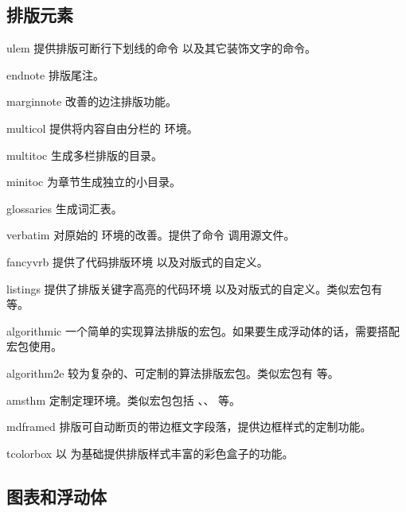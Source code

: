 \subsection{排版元素}\label{subsec:pkg-elements}

\begin{pkglist}
  \item[ulem]        提供排版可断行下划线的命令  以及其它装饰文字的命令。
  \item[endnote]     排版尾注。
  \item[marginnote]  改善的边注排版功能。
  \item[multicol]    提供将内容自由分栏的  环境。
  \item[multitoc]    生成多栏排版的目录。
  \item[minitoc]     为章节生成独立的小目录。
  \item[glossaries]  生成词汇表。
  \item[verbatim]    对原始的  环境的改善。提供了命令  调用源文件。
  \item[fancyvrb]    提供了代码排版环境  以及对版式的自定义。
  \item[listings]    提供了排版关键字高亮的代码环境  以及对版式的自定义。类似宏包有  等。
  \item[algorithmic] 一个简单的实现算法排版的宏包。如果要生成浮动体的话，需要搭配  宏包使用。
  \item[algorithm2e] 较为复杂的、可定制的算法排版宏包。类似宏包有  等。
  \item[amsthm]      定制定理环境。类似宏包包括 、、 等。
  \item[mdframed]    排版可自动断页的带边框文字段落，提供边框样式的定制功能。
  \item[tcolorbox]   以  为基础提供排版样式丰富的彩色盒子的功能。
\end{pkglist}

\subsection{图表和浮动体}\label{subsec:pkg-tab-fig}

